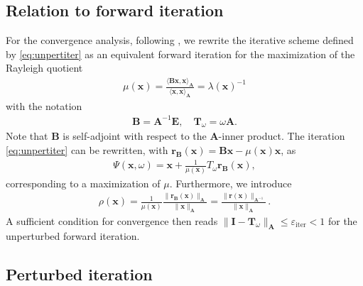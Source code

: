 \documentclass[a4paper,11pt,oneside]{amsart}
\theoremstyle{definition}
\theoremstyle{remark}
\newcommand{\E}{\ten E}
\newcommand{\ten}[1]{\boldsymbol{#1}}
\newcommand{\eiter}{\ensuremath{\varepsilon_{\mathrm{iter}}}}
\numberwithin{equation}{section}
\numberwithin{theorem}{section}
\begin{document}
\subsection{Relation to forward iteration}\label{corfor}
For the convergence analysis, following \cite{KN:09,Rohwedder:11}, we rewrite the iterative scheme defined by \eqref{eq:unpertiter} as an equivalent forward iteration 
for the maximization of the Rayleigh quotient
\begin{align*}
 \mu(\ten x) = \frac{\langle  \ten B\ten x, \ten x \rangle_{\ten  A}}{\langle \ten x,\ten x \rangle_{\ten A}} = \lambda(\ten x)^{-1}
\end{align*}
with the notation
\begin{align*}
  \ten B = \ten A^{-1} \E, \quad \ten T_\omega = \omega \ten A.
\end{align*}
Note that $\ten B$ is self-adjoint with respect to the $\ten A$-inner product. The iteration \eqref{eq:unpertiter} can be rewritten, with $\ten r_{\ten B}(\ten x) = \ten B \ten x - \mu(\ten x) \ten x$, as
\begin{align*}
 \Psi (\ten x, \omega) = \ten x + \frac{1}{\mu(\ten x) } T_\omega \ten r_{\ten B}(\ten x),
\end{align*}
corresponding to a maximization of $\mu$. Furthermore, we introduce
\begin{align*}
 \rho(\ten x)
 = \frac{1}{\mu(\ten x) } \frac{\| \ten r_{\ten B}(\ten x) \|_{\ten A}}{\|\ten x\|_{\ten A}} = \frac{\|\ten r(\ten x)\|_{\ten A^{-1}}}{\|\ten x\|_{\ten A}}\,.
\end{align*}
A sufficient condition for convergence then reads $\| \ten I - \ten T_\omega \|_{\ten A} \leq \eiter < 1$ for the unperturbed forward iteration. 


\subsection{Perturbed iteration}
\end{document}
